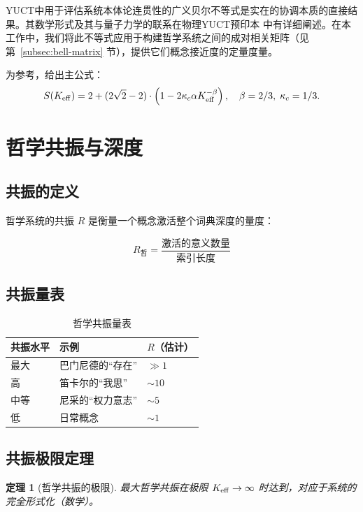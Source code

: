 \documentclass[11pt,a4paper]{article}
\newtheorem{theorem}{定理}[section]
\newcommand{\kappac}{\kappa_c}
\newcommand{\betaf}{\beta}
\begin{document}
	YUCT中用于评估系统本体论连贯性的广义贝尔不等式是实在的协调本质的直接结果。其数学形式及其与量子力学的联系在物理YUCT预印本 \cite{Yakushev2026b} 中有详细阐述。在本工作中，我们将此不等式应用于构建哲学系统之间的成对相关矩阵（见第~\ref{subsec:bell-matrix} 节），提供它们概念接近度的定量度量。
	
	为参考，给出主公式：
	\[
	S(\Keff) = 2 + (2\sqrt{2} - 2) \cdot \left(1 - 2\kappac \alpha \Keff^{-\betaf}\right), \quad \betaf=2/3,\; \kappac=1/3.
	\]
	
	\section{哲学共振与深度}
	
	\subsection{共振的定义}
	
	哲学系统的共振 \(R\) 是衡量一个概念激活整个词典深度的量度：
	
	\begin{equation}
		R_{\text{哲}} = \frac{\text{激活的意义数量}}{\text{索引长度}}
	\end{equation}
	
	\subsection{共振量表}
	
	\begin{table}[H]
		\centering
		\caption{哲学共振量表}
		\begin{tabular}{p{4cm}p{5cm}p{5cm}}
			\toprule
			\textbf{共振水平} & \textbf{示例} & \textbf{\(R\)（估计）} \\
			\midrule
			最大 & 巴门尼德的“存在” & \(\gg 1\) \\
			高 & 笛卡尔的“我思” & \(\sim 10\) \\
			中等 & 尼采的“权力意志” & \(\sim 5\) \\
			低 & 日常概念 & \(\sim 1\) \\
			\bottomrule
		\end{tabular}
	\end{table}
	
	\subsection{共振极限定理}
	
	\begin{theorem}[哲学共振的极限]
		最大哲学共振在极限 \(\Keff \to \infty\) 时达到，对应于系统的完全形式化（数学）。
	\end{theorem}
	
\end{document}

